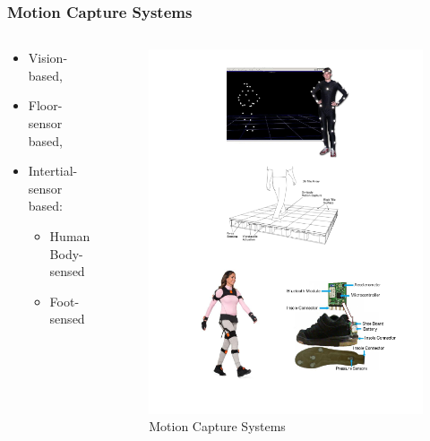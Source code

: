 \documentclass[
first,
ETH1,
navigation
]{ETHbeamerclass}
\begin{document}
\begin{frame}
\frametitle{Motion Capture Systems}

\begin{columns}[onlytextwidth]
\begin{column}{0.5\textwidth}
\begin{itemize}
 \item Vision-based,
 \item Floor-sensor based, 
 \item Intertial-sensor based:
 \begin{itemize}
  \item Human Body-sensed
  \item Foot-sensed
 \end{itemize}
\end{itemize}
\end{column} 
\begin{column}{0.5\textwidth}
\begin{figure}
\includegraphics[scale=0.25]{motioncapturesystems}
\centering 
\caption{Motion Capture Systems}
\end{figure}
    \end{column}
\end{columns}
\end{frame}
\end{document}
